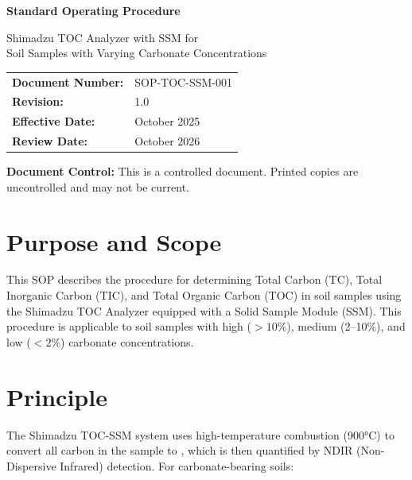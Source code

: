 \documentclass[11pt,a4paper]{article}\usepackage[]{graphicx}\usepackage[]{xcolor}
\begin{document}
\begin{titlepage}
    \centering
    \vspace*{2cm}
    
    {\Huge\bfseries Standard Operating Procedure\par}
    \vspace{1cm}
    {\Large Shimadzu TOC Analyzer with SSM for\\Soil Samples with Varying Carbonate Concentrations\par}
    \vspace{2cm}
    
    \begin{tabular}{ll}
        \toprule
        \textbf{Document Number:} & SOP-TOC-SSM-001 \\
        \textbf{Revision:} & 1.0 \\
        \textbf{Effective Date:} & October 2025 \\
        \textbf{Review Date:} & October 2026 \\
        \bottomrule
    \end{tabular}
    
    \vfill
    
    {\large \textbf{Document Control:} This is a controlled document. Printed copies are uncontrolled and may not be current.\par}
    
\end{titlepage}

\tableofcontents
\newpage

\section{Purpose and Scope}

This SOP describes the procedure for determining Total Carbon (TC), Total Inorganic Carbon (TIC), and Total Organic Carbon (TOC) in soil samples using the Shimadzu TOC Analyzer equipped with a Solid Sample Module (SSM). This procedure is applicable to soil samples with high ($>10\%$), medium (2--10\%), and low ($<2\%$) carbonate concentrations.

\section{Principle}

The Shimadzu TOC-SSM system uses high-temperature combustion (900°C) to convert all carbon in the sample to , which is then quantified by NDIR (Non-Dispersive Infrared) detection. For carbonate-bearing soils:
\end{document}
